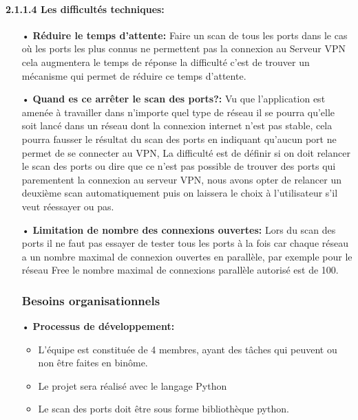 \documentclass[12pt,a4paper]{article}
\begin{document}
\paragraph{2.1.1.4 Les difficultés techniques: }
\begin{itemize}
\item[•] \textbf{Réduire le temps d’attente: }
Faire un scan de tous les ports dans le cas où  les ports les plus connus ne permettent pas la connexion au Serveur VPN cela augmentera le temps de réponse la difficulté c’est de trouver un mécanisme qui permet de réduire ce temps d’attente.\\
\item[•] \textbf{Quand es ce arrêter le scan des ports?: }
Vu que l’application est amenée à travailler dans n’importe quel type de réseau il se pourra qu’elle soit lancé dans un réseau dont la connexion internet n’est pas stable, cela pourra fausser le résultat du scan des ports en indiquant qu’aucun port ne permet de se connecter au VPN, La difficulté est de définir si on doit relancer le scan des ports ou dire que ce n’est pas possible de trouver des ports qui parementent la connexion au serveur VPN, nous avons opter de relancer un deuxième scan automatiquement puis on laissera le choix à l’utilisateur s’il veut réessayer ou pas.
\end{itemize}
\begin{itemize}
\item[•] \textbf{Limitation de nombre des connexions ouvertes: }
Lors du scan des ports il ne faut pas essayer de tester tous les ports à la fois car chaque réseau a un nombre maximal de connexion ouvertes en parallèle, par exemple pour le réseau Free le nombre maximal de connexions parallèle autorisé est de 100.
\subsubsection{Besoins organisationnels}

\item[•] \textbf{Processus de développement: }\\
\begin{itemize}
\item L’équipe est constituée de 4 membres, ayant des tâches qui peuvent ou non être faites en binôme.\\
\item Le projet sera réalisé avec le langage Python\\
\item Le scan des ports doit être sous forme bibliothèque python.
\end{itemize}
\end{itemize}
\end{document}
